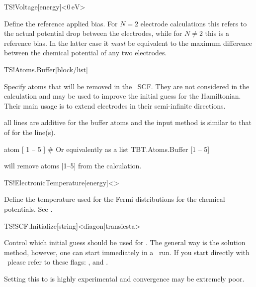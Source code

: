 \begin{fdfentry}{TS!Voltage}[energy]<$0\,\mathrm{eV}$>

  Define the reference applied bias. For $N=2$ electrode calculations
  this refers to the actual potential drop between the electrodes,
  while for $N\neq2$ this is a reference bias. In the latter case it
  \emph{must} be equivalent to the maximum difference between the
  chemical potential of any two electrodes.
  
\end{fdfentry}

\begin{fdfentry}{TS!Atoms.Buffer}[block/list]

  Specify atoms that will be removed in the \tsiesta\ SCF. They are
  not considered in the calculation and may be used to improve the
  initial guess for the Hamiltonian. Their main usage is to extend
  electrodes in their semi-infinite directions.

  \note all lines are additive for the buffer atoms and the input
  method is similar to that of  for the
   line(s).

  \begin{fdfexample}
       atom [ 1 -- 5 ]
    # Or equivalently as a list   
    TBT.Atoms.Buffer [1 -- 5]
  \end{fdfexample}
  will remove atoms [1--5] from the calculation.

\end{fdfentry}

\begin{fdfentry}{TS!ElectronicTemperature}[energy]<>

  Define the temperature used for the Fermi distributions for the
  chemical potentials. 
  See .

\end{fdfentry}

\begin{fdfentry}{TS!SCF.Initialize}[string]<diagon|transiesta>%

  Control which initial guess should be used for \tsiesta. The
  general way is the  solution method, however, one can
  start immediately in a \tsiesta\ run. If you start directly with
  \tsiesta\ please refer to these flags: ,
   and .
  
  \note Setting this to  is highly experimental and
  convergence may be extremely poor.

\end{fdfentry}

